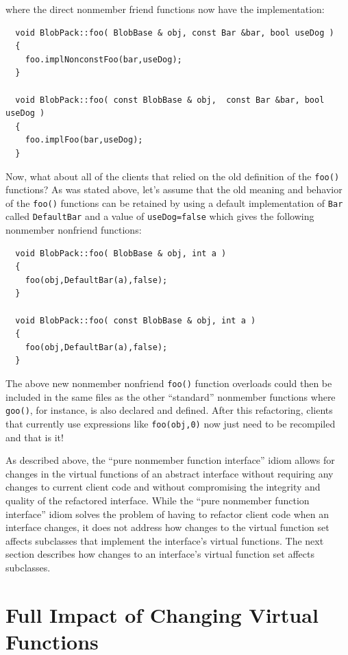 \documentclass[pdf,ps2pdf,11pt]{SANDreport}
\begin{document}
{}\noindent{}where the direct nonmember friend functions now have the
implementation:

{\small\begin{verbatim}
  void BlobPack::foo( BlobBase & obj, const Bar &bar, bool useDog )
  {
    foo.implNonconstFoo(bar,useDog);
  }

  void BlobPack::foo( const BlobBase & obj,  const Bar &bar, bool useDog )
  {
    foo.implFoo(bar,useDog);
  }
\end{verbatim}}

Now, what about all of the clients that relied on the old definition of the
{}\texttt{foo()} functions?  As was stated above, let's assume that the old
meaning and behavior of the {}\texttt{foo()} functions can be retained by
using a default implementation of {}\texttt{Bar} called {}\texttt{DefaultBar}
and a value of {}\texttt{useDog=false} which gives the following nonmember
nonfriend functions:

{\small\begin{verbatim}
  void BlobPack::foo( BlobBase & obj, int a )
  {
    foo(obj,DefaultBar(a),false);
  }

  void BlobPack::foo( const BlobBase & obj, int a )
  {
    foo(obj,DefaultBar(a),false);
  }
\end{verbatim}}

The above new nonmember nonfriend {}\texttt{foo()} function overloads could
then be included in the same files as the other ``standard'' nonmember
functions where {}\texttt{goo()}, for instance, is also declared and defined.
After this refactoring, clients that currently use expressions like
{}\texttt{foo(obj,0)} now just need to be recompiled and that is it!

As described above, the ``pure nonmember function interface'' idiom allows for
changes in the virtual functions of an abstract interface without requiring
any changes to current client code and without compromising the integrity and
quality of the refactored interface.  While the ``pure nonmember function
interface'' idiom solves the problem of having to refactor client code when an
interface changes, it does not address how changes to the virtual function set
affects subclasses that implement the interface's virtual functions.  The next
section describes how changes to an interface's virtual function set affects
subclasses.

%
\section{Full Impact of Changing Virtual Functions}
%
\end{document}
